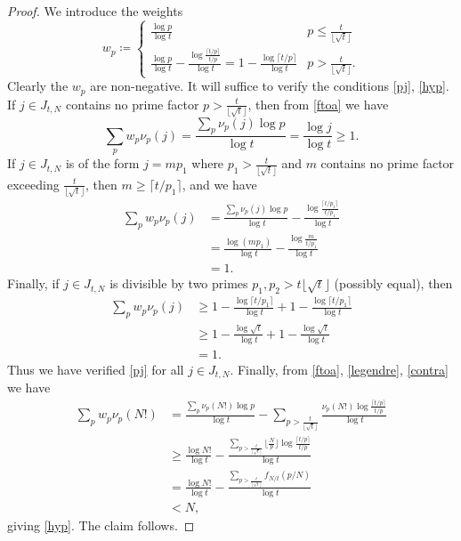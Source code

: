 \documentclass[12pt,a4paper,reqno]{amsart}
\numberwithin{equation}{section}
\theoremstyle{plain}
\theoremstyle{definition}
\begin{document}
\begin{proof} We introduce the weights
  $$ 
w_p \coloneqq  \begin{cases} 
  \frac{\log p}{\log t} & p  \leq \frac{t}{\lfloor \sqrt{t} \rfloor} \\
  \frac{\log p}{\log t} - \frac{\log \frac{\lceil t/p \rceil}{t/p}}{\log t} = 1 - \frac{\log \lceil t/p \rceil}{\log t} & p  > \frac{t}{\lfloor \sqrt{t} \rfloor}.
\end{cases}
$$
Clearly the $w_p$ are non-negative.  It will suffice to verify the conditions \eqref{pj}, \eqref{hyp}.  If $j \in J_{t,N}$ contains no prime factor $p > \frac{t}{\lfloor \sqrt{t} \rfloor}$, then from \eqref{ftoa} we have
$$ \sum_p w_p \nu_p(j) = \frac{\sum_p \nu_p(j) \log p}{\log t} = \frac{\log j}{\log t} \geq 1.$$
If $j \in J_{t,N}$ is of the form $j = mp_1$ where $p_1 > \frac{t}{\lfloor \sqrt{t} \rfloor}$ and $m$ contains no prime factor exceeding $\frac{t}{\lfloor \sqrt{t} \rfloor}$, then $m \geq \lceil t/p_1 \rceil$, and we have
\begin{align*}
\sum_p w_p \nu_p(j) &= \frac{\sum_p \nu_p(j) \log p}{\log t}
- \frac{\log \frac{\lceil t/p_1 \rceil}{t/p_1}}{\log t}\\
&= \frac{\log(mp_1)}{\log t} -  \frac{\log \frac{m}{t/p_1}}{\log t} \\
&= 1.
\end{align*}
Finally, if $j \in J_{t,N}$ is divisible by two primes $p_1, p_2 > {t}{\lfloor \sqrt{t} \rfloor}$ (possibly equal), then
\begin{align*}
  \sum_p w_p \nu_p(j) &\geq
  1 - \frac{\log \lceil t/p_1 \rceil}{\log t} + 1 - \frac{\log \lceil t/p_1 \rceil}{\log t} \\
  &\geq
  1 - \frac{\log \sqrt{t}}{\log t} + 1 - \frac{\log \sqrt{t}}{\log t} \\
  &= 1.
\end{align*}
Thus we have verified \eqref{pj} for all $j \in J_{t,N}$.  Finally, from \eqref{ftoa}, \eqref{legendre}, \eqref{contra} we have
\begin{align*}
  \sum_p w_p \nu_p(N!) &= \frac{\sum_p \nu_p(N!) \log p}{\log t} - \sum_{p > \frac{t}{\lfloor \sqrt{t} \rfloor}} \frac{\nu_p(N!) \log \frac{\lceil t/p \rceil}{t/p}}{\log t} \\
  &\geq \frac{\log N!}{\log t} -  \frac{\sum_{p > \frac{t}{\lfloor \sqrt{t} \rfloor}} \lfloor \frac{N}{p} \rfloor \log \frac{\lceil t/p \rceil}{t/p}}{\log t}\\
  &= \frac{\log N!}{\log t} - \frac{\sum_{p > \frac{t}{\lfloor \sqrt{t} \rfloor}} f_{N/t}(p/N)}{\log t} \\
  &< N,
\end{align*}
giving \eqref{hyp}.  The claim follows.
\end{proof}
\end{document}
